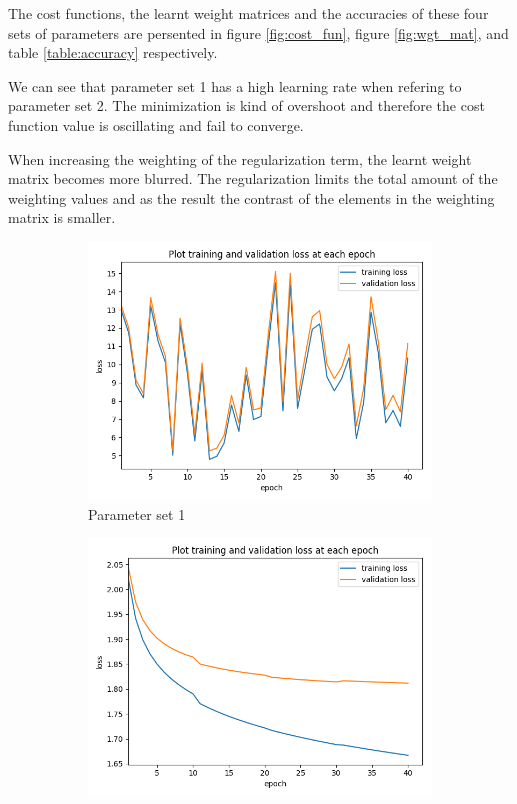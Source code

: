 \documentclass[12pt]{article}
\begin{document}
The cost functions, the learnt weight matrices and the accuracies of these four
sets of parameters are persented in figure \ref{fig:cost_fun}, figure \ref{fig:wgt_mat},
and table \ref{table:accuracy} respectively.

We can see that parameter set 1 has a high learning rate when refering to parameter set 2. 
The minimization is kind of overshoot and therefore the cost function
value is oscillating and fail to converge.

When increasing the weighting of the regularization term, the learnt weight matrix
becomes more blurred. The regularization limits the total amount of the weighting
values and as the result the contrast of the elements in the weighting matrix is smaller.

\begin{figure}
    \centering
    \begin{subfigure}[b]{0.475\textwidth}
        \centering
        \includegraphics[width=\textwidth]{loss_case1.png}
        \caption[]%
        {{\small Parameter set 1}}
    \end{subfigure}
    \hfill
    \begin{subfigure}[b]{0.475\textwidth}
        \centering
        \includegraphics[width=\textwidth]{loss_case2.png}

\end{subfigure}
\end{figure}
\end{document}
